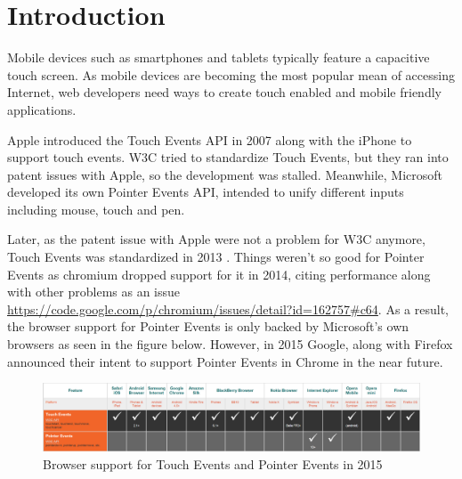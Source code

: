 \documentclass[conference]{IEEEtran}
\begin{document}
\section{Introduction}

Mobile devices such as smartphones and tablets typically feature a capacitive touch screen. As mobile devices are becoming the most popular mean of accessing Internet, web developers need ways to create touch enabled and mobile friendly applications. 

Apple introduced the Touch Events API in 2007 along with the iPhone to support touch events. W3C tried to standardize Touch Events, but they ran into patent issues with Apple, so the development was stalled. Meanwhile, Microsoft developed its own Pointer Events API, intended to unify different inputs including mouse, touch and pen. 

Later, as the patent issue with Apple were not a problem for W3C anymore, Touch Events was standardized in 2013 \cite{W3CTouchEvents}. Things weren't so good for Pointer Events as chromium dropped support for it in 2014, citing performance along with other problems as an issue \url{https://code.google.com/p/chromium/issues/detail?id=162757#c64}. As a result, the browser support for Pointer Events is only backed by Microsoft's own browsers as seen in the figure below. However, in 2015 Google, along with Firefox announced their intent to support Pointer Events in Chrome in the near future. 


\begin{figure}[htbd]
    \centering
    \includegraphics[scale=0.18]{htmltouchevents.png}
    \caption{Browser support for Touch Events and Pointer Events in 2015 \cite{MobileHTML5}}
\end{figure}


\end{document}
